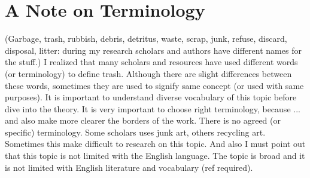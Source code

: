 



\section{A Note on Terminology}
(Garbage, trash, rubbish, debris, detritus, waste, scrap, junk, refuse, discard, disposal, litter: during my research scholars and authors have different names for the stuff.) I realized that many scholars and resources have used different words (or terminology) to define trash. Although there are slight differences between these words, sometimes they are used to signify same concept (or used with same purposes). It is important to understand diverse vocabulary of this topic before dive into the theory. It is very important to choose right terminology, because ... and also make more clearer the borders of the work. There is no agreed (or specific) terminology. Some scholars uses junk art, others recycling art. Sometimes this make difficult to research on this topic. And also I must point out that this topic is not limited with the English language. The topic is broad and it is not limited with English literature and vocabulary (ref required). 

